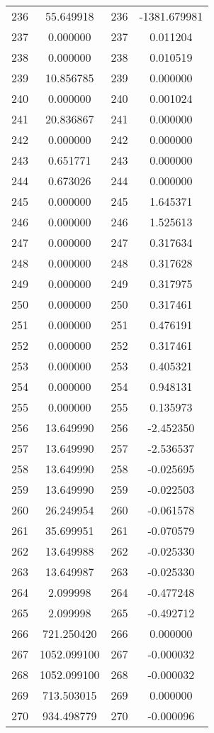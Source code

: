 \documentclass[12pt]{article}
\begin{document}
\begin{longtable}{@{}cccc@{}}
236 & 55.649918 & 236 & -1381.679981 \\
237 & 0.000000 & 237 & 0.011204 \\
238 & 0.000000 & 238 & 0.010519 \\
239 & 10.856785 & 239 & 0.000000 \\
240 & 0.000000 & 240 & 0.001024 \\
241 & 20.836867 & 241 & 0.000000 \\
242 & 0.000000 & 242 & 0.000000 \\
243 & 0.651771 & 243 & 0.000000 \\
244 & 0.673026 & 244 & 0.000000 \\
245 & 0.000000 & 245 & 1.645371 \\
246 & 0.000000 & 246 & 1.525613 \\
247 & 0.000000 & 247 & 0.317634 \\
248 & 0.000000 & 248 & 0.317628 \\
249 & 0.000000 & 249 & 0.317975 \\
250 & 0.000000 & 250 & 0.317461 \\
251 & 0.000000 & 251 & 0.476191 \\
252 & 0.000000 & 252 & 0.317461 \\
253 & 0.000000 & 253 & 0.405321 \\
254 & 0.000000 & 254 & 0.948131 \\
255 & 0.000000 & 255 & 0.135973 \\
256 & 13.649990 & 256 & -2.452350 \\
257 & 13.649990 & 257 & -2.536537 \\
258 & 13.649990 & 258 & -0.025695 \\
259 & 13.649990 & 259 & -0.022503 \\
260 & 26.249954 & 260 & -0.061578 \\
261 & 35.699951 & 261 & -0.070579 \\
262 & 13.649988 & 262 & -0.025330 \\
263 & 13.649987 & 263 & -0.025330 \\
264 & 2.099998 & 264 & -0.477248 \\
265 & 2.099998 & 265 & -0.492712 \\
266 & 721.250420 & 266 & 0.000000 \\
267 & 1052.099100 & 267 & -0.000032 \\
268 & 1052.099100 & 268 & -0.000032 \\
269 & 713.503015 & 269 & 0.000000 \\
270 & 934.498779 & 270 & -0.000096 \\

\end{longtable}
\end{document}

